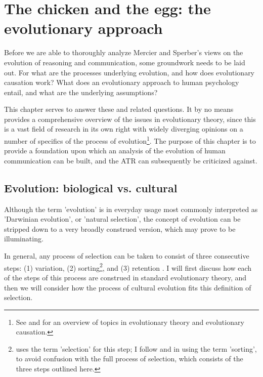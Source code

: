 \chapter{The chicken and the egg: the evolutionary approach}
\label{ch:evolution}


Before we are able to thoroughly analyze Mercier and Sperber's views on the evolution of reasoning and communication, some groundwork needs to be laid out. For what are the processes underlying evolution, and how does evolutionary causation work? What does an evolutionary approach to human psychology entail, and what are the underlying assumptions?

This chapter serves to answer these and related questions. It by no means provides a comprehensive overview of the issues in evolutionary theory, since this is a vast field of research in its own right with widely diverging opinions on a number of specifics of the process of evolution\footnote{See \citet{Ariew02} and \citet{UllerLaland19} for an overview of topics in evolutionary theory and evolutionary causation.}.
The purpose of this chapter is to provide a foundation upon which an analysis of the evolution of human communication can be built, and the ATR can subsequently be criticized against.

\section{Evolution: biological vs. cultural}
\label{sec:evo-bio-culture}

Although the term 'evolution' is in everyday usage most commonly interpreted as 'Darwinian evolution', or 'natural selection', the concept of evolution can be stripped down to a very broadly construed version, which may prove to be illuminating.

In general, any process of selection can be taken to consist of three consecutive steps: (1) variation, (2) sorting\footnote{\citet{Donahoe03} uses the term 'selection' for this step; I follow \citet{Heyes18} and \citet{S-P13} in using the term 'sorting', to avoid confusion with the full process of selection, which consists of the three steps outlined here.}, and (3) retention \citep{Donahoe03}. I will first discuss how each of the steps of this process are construed in standard evolutionary theory, and then we will consider how the process of cultural evolution fits this definition of selection.

